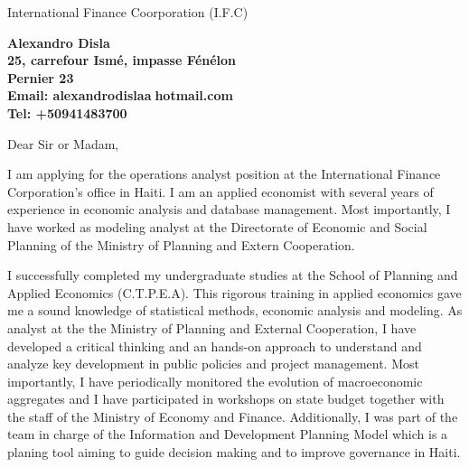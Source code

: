 \documentclass[11pt]{letter} %
\begin{document}

\begin{letter}{International Finance Coorporation (I.F.C) } 


\begin{center}
\large\bf Alexandro Disla\\ %
25, carrefour Ism\'{e}, impasse F\'{e}n\'{e}lon\\ Pernier 23 \\ %
Email: alexandrodisla\textcircled{a}hotmail.com \\
Tel: +50941483700
\end{center} 
\vfill

\signature{Alexandro Disla} %


\opening{Dear Sir or Madam,} 
 
I am applying for the operations analyst position at the International Finance Corporation’s office in Haiti. I am an applied economist with several years of experience in economic analysis and database management. Most importantly, I have worked as modeling analyst at the Directorate of Economic and Social Planning of the Ministry of Planning and Extern Cooperation. 

I successfully completed my undergraduate studies at the School of Planning and Applied Economics (C.T.P.E.A). This rigorous training in applied economics gave me a sound knowledge of statistical methods, economic analysis and modeling. As analyst at the the Ministry of Planning and External Cooperation, I have developed  a critical thinking and an hands-on approach to understand and analyze key development in public policies and project management. Most importantly, I have periodically monitored the evolution of macroeconomic aggregates and I have participated in workshops on state budget together with the staff of the Ministry of Economy and Finance. Additionally, I was part of the team in charge of the Information and Development Planning Model which is a planing tool aiming to guide decision making and to improve governance in Haiti.


\end{letter}
\end{document}
